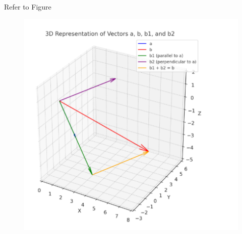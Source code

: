 \documentclass[journal]{IEEEtran}
\begin{document}
Refer to Figure

\begin{figure}[H]
\begin{center}
\includegraphics[width=0.6\columnwidth]{figs/Graph3.png}
\end{center}
\caption{}
\label{fig:Fig}
\end{figure}
\end{document}
